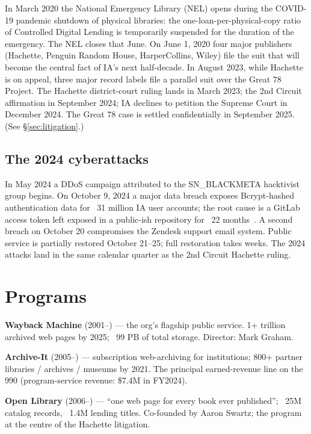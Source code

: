 \documentclass[10pt,letterpaper,twocolumn]{article}
\begin{document}
In March 2020 the National Emergency Library (NEL) opens during the COVID-19 pandemic shutdown of physical libraries: the one-loan-per-physical-copy ratio of Controlled Digital Lending is temporarily suspended for the duration of the emergency. The NEL closes that June. On June 1, 2020 four major publishers (Hachette, Penguin Random House, HarperCollins, Wiley) file the suit that will become the central fact of IA's next half-decade. In August 2023, while Hachette is on appeal, three major record labels file a parallel suit over the Great 78 Project. The Hachette district-court ruling lands in March 2023; the 2nd Circuit affirmation in September 2024; IA declines to petition the Supreme Court in December 2024. The Great 78 case is settled confidentially in September 2025. (See \S\ref{sec:litigation}.)

\subsection{The 2024 cyberattacks}

In May 2024 a DDoS campaign attributed to the SN\_BLACKMETA hacktivist group begins. On October 9, 2024 a major data breach exposes Bcrypt-hashed authentication data for ~31 million IA user accounts; the root cause is a GitLab access token left exposed in a public-ish repository for ~22 months~\citep{ia2024databreach}. A second breach on October 20 compromises the Zendesk support email system. Public service is partially restored October 21--25; full restoration takes weeks. The 2024 attacks land in the same calendar quarter as the 2nd Circuit Hachette ruling.

\section{Programs}

\textbf{Wayback Machine} (2001--) --- the org's flagship public service. 1+ trillion archived web pages by 2025; ~99 PB of total storage. Director: Mark Graham.

\textbf{Archive-It} (2005--) --- subscription web-archiving for institutions; 800+ partner libraries / archives / museums by 2021. The principal earned-revenue line on the 990 (program-service revenue: \$7.4M in FY2024).

\textbf{Open Library} (2006--) --- ``one web page for every book ever published''; ~25M catalog records, ~1.4M lending titles. Co-founded by Aaron Swartz; the program at the centre of the Hachette litigation.
\end{document}
